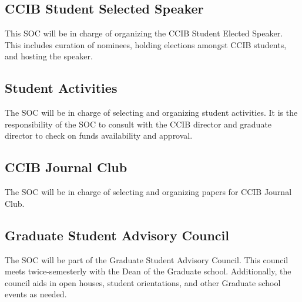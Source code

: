 \subsection{CCIB Student Selected Speaker}

This SOC will be in charge of organizing the CCIB Student Elected Speaker. This includes curation of nominees, holding elections amongst CCIB students, and hosting the speaker. 

\subsection{Student Activities}

The SOC will be in charge of selecting and organizing student activities. It is the responsibility of the SOC to consult with the CCIB director and graduate director to check on funds availability and approval.

\subsection{CCIB Journal Club}

The SOC will be in charge of selecting and organizing papers for CCIB Journal Club.


\subsection{Graduate Student Advisory Council}

The SOC will be part of the Graduate Student Advisory Council. This council meets twice-semesterly with the Dean of the Graduate school. Additionally, the council aids in open houses, student orientations, and other Graduate school events as needed.



